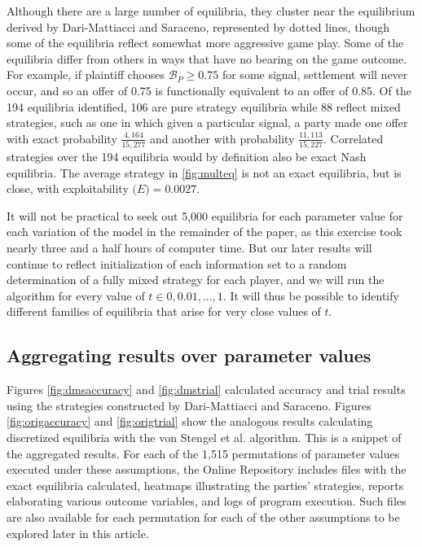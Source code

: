 \documentclass{article}
\begin{document}
Although there are a large number of equilibria, they cluster near the equilibrium derived by Dari-Mattiacci and Saraceno, represented by dotted lines, though some of the equilibria reflect somewhat more aggressive game play. Some of the equilibria differ from others in ways that have no bearing on the game outcome. For example, if plaintiff chooses $\mathcal{B}_P \geq 0.75$ for some signal, settlement will never occur, and so an offer of 0.75 is functionally equivalent to an offer of 0.85. Of the 194 equilibria identified, 106 are pure strategy equilibria while 88 reflect mixed strategies, such as one in which given a particular signal, a party made one offer with exact probability $\frac{4,164}{15,277}$ and another with probability $\frac{11,113}{15,227}$. Correlated strategies over the 194 equilibria would by definition also be exact Nash equilibria. The average strategy in \ref{fig:multeq} is not an exact equilibria, but is close, with exploitability $\mathcal(E)=0.0027$. 

It will not be practical to seek out 5,000 equilibria for each parameter value for each variation of the model in the remainder of the paper, as this exercise took nearly three and a half hours of computer time. But our later results will continue to reflect initialization of each information set to a random determination of a fully mixed strategy for each player, and we will run the algorithm for every value of $t \in {0, 0.01, ..., 1}$. It will thus be possible to identify different families of equilibria that arise for very close values of $t$.

\subsection{Aggregating results over parameter values}

Figures \ref{fig:dmsaccuracy} and \ref{fig:dmstrial} calculated accuracy and trial results using the strategies constructed by Dari-Mattiacci and Saraceno. Figures \ref{fig:origaccuracy} and \ref{fig:origtrial} show the analogous results calculating discretized equilibria with the von Stengel et al. algorithm. This is a snippet of the aggregated results. For each of the 1,515 permutations of parameter values executed under these assumptions, the Online Repository includes files with the exact equilibria calculated, heatmaps illustrating the parties' strategies, reports elaborating various outcome variables, and logs of program execution. Such files are also available for each permutation for each of the other assumptions to be explored later in this article.
\end{document}
